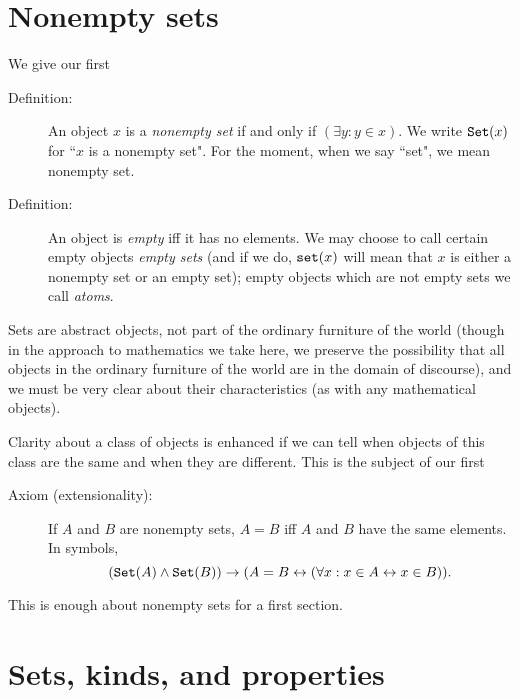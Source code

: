 \documentclass[12pt]{article}
\begin{document}
\newpage

\section{Nonempty sets}

We give our first

\begin{description}

\item[Definition:]  An object $x$ is a {\em nonempty set\/} if and only if $(\exists y:y \in x)$.  We write ${\tt Set}(x)$ for ``$x$ is a nonempty set".  For the moment, when we say ``set",  we mean nonempty set.

\item[Definition:]  An object is {\em empty\/} iff it has no elements.  We may choose to call certain empty objects {\em empty sets\/} (and if we do, ${\tt set}(x)$ will mean that $x$ is either a nonempty set or an empty set);  empty objects which are not empty sets we call {\em atoms\/}.

\end{description}

Sets are abstract objects, not part of the ordinary furniture of the world (though in the approach to mathematics we take here, we preserve the possibility that all objects in the ordinary furniture of the world are in the domain of discourse), and we must be very clear about their characteristics (as with any mathematical objects).

Clarity about a class of objects is enhanced if we can tell when objects of this class are the same and when they are different.  This is the subject of our first

\begin{description}

\item[Axiom (extensionality):]  If $A$ and $B$ are nonempty sets, $A=B$ iff $A$ and $B$ have the same elements.  In symbols, $$({\tt Set}(A) \wedge {\tt Set}(B)) \rightarrow (A = B \leftrightarrow (\forall x:x \in A \leftrightarrow x \in B)).$$

\end{description}

This is enough about nonempty sets for a first section.

\newpage

\section{Sets, kinds, and properties}
\end{document}
